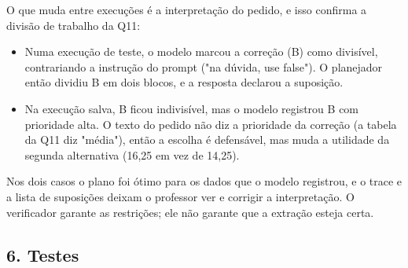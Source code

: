 \documentclass[12pt, a4paper]{article}
\providecommand{\tightlist}{%
  \setlength{\itemsep}{0pt}\setlength{\parskip}{0pt}}
\begin{document}
O que muda entre execuções é a interpretação do pedido, e isso confirma a divisão de trabalho da Q11:

\begin{itemize}
\tightlist
\item
  Numa execução de teste, o modelo marcou a correção (B) como divisível, contrariando a instrução do prompt ("na dúvida, use false"). O planejador então dividiu B em dois blocos, e a resposta declarou a suposição.
\item
  Na execução salva, B ficou indivisível, mas o modelo registrou B com prioridade alta. O texto do pedido não diz a prioridade da correção (a tabela da Q11 diz "média"), então a escolha é defensável, mas muda a utilidade da segunda alternativa (16,25 em vez de 14,25).
\end{itemize}

Nos dois casos o plano foi ótimo para os dados que o modelo registrou, e o trace e a lista de suposições deixam o professor ver e corrigir a interpretação. O verificador garante as restrições; ele não garante que a extração esteja certa.

\subsection{6. Testes}\label{6-testes}
\end{document}
